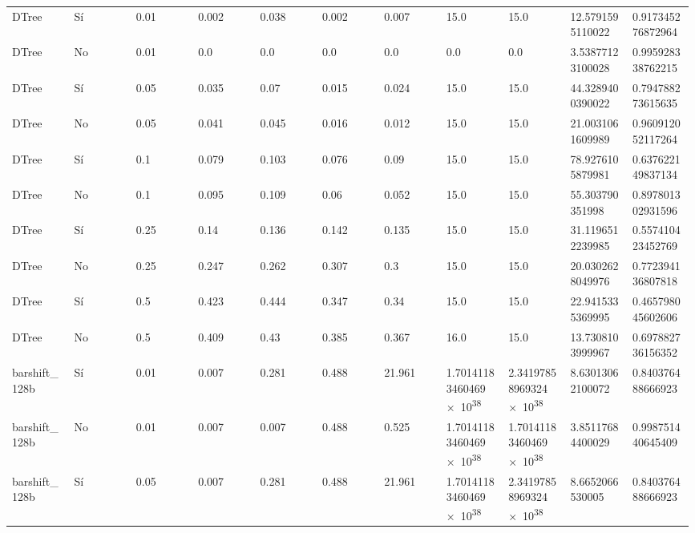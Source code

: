 {{\begin{longtable}{M{0.09\linewidth}M{0.09\linewidth}M{0.09\linewidth}M{0.09\linewidth}M{0.09\linewidth}M{0.09\linewidth}M{0.09\linewidth}M{0.09\linewidth}M{0.09\linewidth}M{0.09\linewidth}M{0.09\linewidth}}
DTree & Sí & \num{0.01} & \num{0.002} & \num{0.038} & \num{0.002} & \num{0.007} & \num{15.0} & \num{15.0} & \num{12.5791595110022} & \num{0.917345276872964} \\
DTree & No & \num{0.01} & \num{0.0} & \num{0.0} & \num{0.0} & \num{0.0} & \num{0.0} & \num{0.0} & \num{3.53877123100028} & \num{0.995928338762215} \\
DTree & Sí & \num{0.05} & \num{0.035} & \num{0.07} & \num{0.015} & \num{0.024} & \num{15.0} & \num{15.0} & \num{44.3289400390022} & \num{0.794788273615635} \\
DTree & No & \num{0.05} & \num{0.041} & \num{0.045} & \num{0.016} & \num{0.012} & \num{15.0} & \num{15.0} & \num{21.0031061609989} & \num{0.960912052117264} \\
DTree & Sí & \num{0.1} & \num{0.079} & \num{0.103} & \num{0.076} & \num{0.09} & \num{15.0} & \num{15.0} & \num{78.9276105879981} & \num{0.637622149837134} \\
DTree & No & \num{0.1} & \num{0.095} & \num{0.109} & \num{0.06} & \num{0.052} & \num{15.0} & \num{15.0} & \num{55.303790351998} & \num{0.897801302931596} \\
DTree & Sí & \num{0.25} & \num{0.14} & \num{0.136} & \num{0.142} & \num{0.135} & \num{15.0} & \num{15.0} & \num{31.1196512239985} & \num{0.557410423452769} \\
DTree & No & \num{0.25} & \num{0.247} & \num{0.262} & \num{0.307} & \num{0.3} & \num{15.0} & \num{15.0} & \num{20.0302628049976} & \num{0.772394136807818} \\
DTree & Sí & \num{0.5} & \num{0.423} & \num{0.444} & \num{0.347} & \num{0.34} & \num{15.0} & \num{15.0} & \num{22.9415335369995} & \num{0.465798045602606} \\
DTree & No & \num{0.5} & \num{0.409} & \num{0.43} & \num{0.385} & \num{0.367} & \num{16.0} & \num{15.0} & \num{13.7308103999967} & \num{0.697882736156352} \\
barshift\_128b & Sí & \num{0.01} & \num{0.007} & \num{0.281} & \num{0.488} & \num{21.961} & \num{1.70141183460469e+38} & \num{2.34197858969324e+38} & \num{8.63013062100072} & \num{0.840376488666923} \\
barshift\_128b & No & \num{0.01} & \num{0.007} & \num{0.007} & \num{0.488} & \num{0.525} & \num{1.70141183460469e+38} & \num{1.70141183460469e+38} & \num{3.85117684400029} & \num{0.998751440645409} \\
barshift\_128b & Sí & \num{0.05} & \num{0.007} & \num{0.281} & \num{0.488} & \num{21.961} & \num{1.70141183460469e+38} & \num{2.34197858969324e+38} & \num{8.6652066530005} & \num{0.840376488666923} \\

\end{longtable}}}
